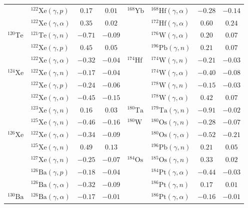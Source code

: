 \begin{table}
\begin{tabular}{llcc|llcc}
    $ $ & $^{122}\mathrm{Xe}(\gamma,p)$ & $0.17$ & $0.01$ & $^{168}\mathrm{Yb}$ & $^{168}\mathrm{Hf}(\gamma,\alpha)$ & $-0.28$ & $-0.14$ \\ 
    $ $ & $^{122}\mathrm{Xe}(\gamma,\alpha)$ & $0.35$ & $0.02$ & $ $ & $^{172}\mathrm{Hf}(\gamma,\alpha)$ & $0.60$ & $0.24$ \\ 
    $^{120}\mathrm{Te}$ & $^{121}\mathrm{Te}(\gamma,n)$ & $-0.71$ & $-0.09$ & $ $ & $^{176}\mathrm{W}(\gamma,\alpha)$ & $0.20$ & $0.07$ \\ 
    $ $ & $^{122}\mathrm{Xe}(\gamma,p)$ & $0.45$ & $0.05$ & $ $ & $^{196}\mathrm{Pb}(\gamma,n)$ & $0.21$ & $0.07$ \\ 
    $ $ & $^{122}\mathrm{Xe}(\gamma,\alpha)$ & $-0.32$ & $-0.04$ & $^{174}\mathrm{Hf}$ & $^{174}\mathrm{W}(\gamma,n)$ & $-0.21$ & $-0.03$ \\ 
    $^{124}\mathrm{Xe}$ & $^{122}\mathrm{Xe}(\gamma,n)$ & $-0.17$ & $-0.04$ & $ $ & $^{174}\mathrm{W}(\gamma,\alpha)$ & $-0.40$ & $-0.08$ \\ 
    $ $ & $^{122}\mathrm{Xe}(\gamma,p)$ & $-0.24$ & $-0.06$ & $ $ & $^{178}\mathrm{W}(\gamma,n)$ & $-0.15$ & $-0.03$ \\ 
    $ $ & $^{122}\mathrm{Xe}(\gamma,\alpha)$ & $-0.45$ & $-0.15$ & $ $ & $^{178}\mathrm{W}(\gamma,\alpha)$ & $0.42$ & $0.07$ \\ 
    $ $ & $^{123}\mathrm{Xe}(\gamma,n)$ & $0.16$ & $0.03$ & $^{180}\mathrm{Ta}$ & $^{179}\mathrm{Ta}(\gamma,n)$ & $-0.91$ & $-0.02$ \\ 
    $ $ & $^{125}\mathrm{Xe}(\gamma,n)$ & $-0.46$ & $-0.16$ & $^{180}\mathrm{W}$ & $^{180}\mathrm{Os}(\gamma,n)$ & $-0.28$ & $-0.07$ \\ 
    $^{126}\mathrm{Xe}$ & $^{122}\mathrm{Xe}(\gamma,\alpha)$ & $-0.34$ & $-0.09$ & $ $ & $^{180}\mathrm{Os}(\gamma,\alpha)$ & $-0.52$ & $-0.21$ \\ 
    $ $ & $^{125}\mathrm{Xe}(\gamma,n)$ & $0.49$ & $0.13$ & $ $ & $^{196}\mathrm{Pb}(\gamma,n)$ & $0.21$ & $0.05$ \\ 
    $ $ & $^{127}\mathrm{Xe}(\gamma,n)$ & $-0.25$ & $-0.07$ & $^{184}\mathrm{Os}$ & $^{185}\mathrm{Os}(\gamma,n)$ & $0.33$ & $0.02$ \\ 
    $ $ & $^{126}\mathrm{Ba}(\gamma,p)$ & $-0.18$ & $-0.04$ & $ $ & $^{184}\mathrm{Pt}(\gamma,\alpha)$ & $-0.44$ & $-0.03$ \\ 
    $ $ & $^{126}\mathrm{Ba}(\gamma,\alpha)$ & $-0.32$ & $-0.09$ & $ $ & $^{186}\mathrm{Pt}(\gamma,n)$ & $0.17$ & $0.01$ \\ 
    $^{130}\mathrm{Ba}$ & $^{126}\mathrm{Ba}(\gamma,\alpha)$ & $-0.17$ & $-0.01$ & $ $ & $^{186}\mathrm{Pt}(\gamma,\alpha)$ & $-0.16$ & $-0.01$ \\ 

\end{tabular}
\end{table}
